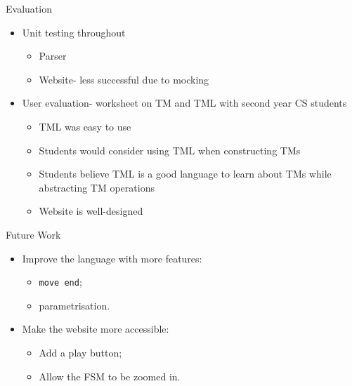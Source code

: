\documentclass{beamer}
\begin{document}
    \begin{frame}{Evaluation}
        \begin{itemize}
            \item Unit testing throughout
            \begin{itemize}
                \item Parser
                \item Website- less successful due to mocking
            \end{itemize}
            \item User evaluation- worksheet on TM and TML with second year CS students
            \begin{itemize}
                \item TML was easy to use
                \item Students would consider using TML when constructing TMs
                \item Students believe TML is a good language to learn about TMs while abstracting TM operations
                \item Website is well-designed
            \end{itemize}
        \end{itemize}
    \end{frame}

    \begin{frame}{Future Work}
        \begin{itemize}
            \item Improve the language with more features:
            \begin{itemize}
                \item \texttt{move end};
                \item parametrisation.
            \end{itemize}
            \item Make the website more accessible:
            \begin{itemize}
                \item Add a play button;
                \item Allow the FSM to be zoomed in.
            \end{itemize}
        \end{itemize}
    \end{frame}
    
\end{document}
